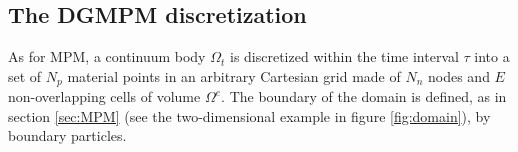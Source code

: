 



\subsection{The DGMPM discretization}
As for MPM, a continuum body $\Omega_t$ is discretized within the time interval $\tau$ into a set of $N_p$ material points in an arbitrary Cartesian grid made of  $N_n$ nodes and $E$ non-overlapping cells of volume $\Omega^e$. The boundary of the domain is defined, as in section \ref{sec:MPM} (see the two-dimensional example in figure \ref{fig:domain}), by boundary particles.

